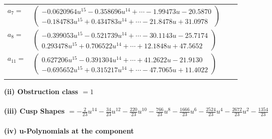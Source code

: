 \documentclass[1p]{elsarticle_modified}
\theoremstyle{definition}
\begin{document}
\begin{tabular}{m{7pt} m{180pt} m{7pt} m{180pt} }
\flushright $a_{7}=$&$\begin{pmatrix}-0.0620964 u^{15}-0.358696 u^{14}+\cdots-1.99473 u-20.5870\\-0.184783 u^{15}+0.434783 u^{14}+\cdots-21.8478 u+31.0978\end{pmatrix}$ \\
\flushright $a_{8}=$&$\begin{pmatrix}-0.399053 u^{15}-0.521739 u^{14}+\cdots-30.1143 u-25.7174\\0.293478 u^{15}+0.706522 u^{14}+\cdots+12.1848 u+47.5652\end{pmatrix}$ \\
\flushright $a_{11}=$&$\begin{pmatrix}0.627206 u^{15}-0.391304 u^{14}+\cdots+41.2622 u-21.9130\\-0.695652 u^{15}+0.315217 u^{14}+\cdots-47.7065 u+11.4022\end{pmatrix}$\\&\end{tabular}
\flushleft \textbf{(ii) Obstruction class $= 1$}\\~\\
\flushleft \textbf{(iii) Cusp Shapes $= -\frac{2}{23} u^{14}-\frac{34}{23} u^{12}-\frac{220}{23} u^{10}-\frac{766}{23} u^8-\frac{1666}{23} u^6-\frac{2524}{23} u^4-\frac{2672}{23} u^2-\frac{1354}{23}$}\\~\\
\newpage\renewcommand{\arraystretch}{1}
\flushleft \textbf{(iv) u-Polynomials at the component}\newline \\
\end{document}
